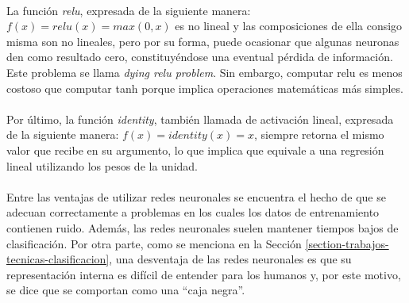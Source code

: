\newpage %

\paragraph{} La función \textit{relu}, expresada de la siguiente manera: $f(x) = relu(x) = max(0, x)$ es no lineal y las composiciones de ella consigo misma son no lineales, pero por su forma, puede ocasionar que algunas neuronas den como resultado cero, constituyéndose una eventual pérdida de información.
Este problema se llama \textit{dying relu problem}.
Sin embargo, computar relu es menos costoso que computar tanh porque implica operaciones matemáticas más simples.

\paragraph{} Por último, la función \textit{identity}, también llamada de activación lineal, expresada de la siguiente manera: $f(x) = identity(x) = x$, siempre retorna el mismo valor que recibe en su argumento, lo que implica que equivale a una regresión lineal utilizando los pesos de la unidad.

\paragraph{}Entre las ventajas de utilizar redes neuronales se encuentra el hecho de que se adecuan correctamente a problemas en los cuales los datos de entrenamiento contienen ruido.
Además, las redes neuronales suelen mantener tiempos bajos de clasificación.
Por otra parte, como se menciona en la Sección \ref{section-trabajos-tecnicas-clasificacion}, una desventaja de las redes neuronales es que su representación interna es difícil de entender para los humanos y, por este motivo, se dice que se comportan como una “caja negra”.